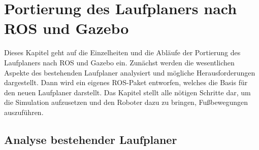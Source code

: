\chapter{Portierung des Laufplaners nach ROS und Gazebo}
\label{kap4}

Dieses Kapitel geht auf die Einzelheiten und die Abläufe der Portierung des Laufplaners nach \ac{ROS} und Gazebo ein. Zunächst werden die wesentlichen Aspekte des bestehenden Laufplaner analysiert und mögliche Herausforderungen dargestellt. Dann wird ein eigenes \ac{ROS}-Paket entworfen, welches die Basis für den neuen Laufplaner darstellt. Das Kapitel stellt alle nötigen Schritte dar, um die Simulation aufzusetzen und den Roboter dazu zu bringen, Fußbewegungen auszuführen.

\section{Analyse bestehender Laufplaner}

